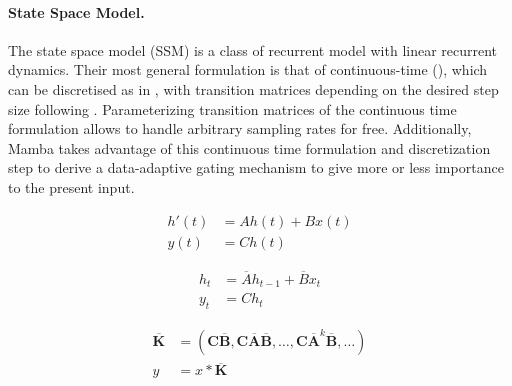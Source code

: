 
\paragraph{State Space Model.} The state space model (SSM) is a class of recurrent model with linear recurrent dynamics. Their most general formulation is that of continuous-time (), which can be discretised as in , with transition matrices depending on the desired step size following . Parameterizing transition matrices of the continuous time formulation allows to handle arbitrary sampling rates for free. Additionally, Mamba \citep{TODO:Mamba} takes advantage of this continuous time formulation and discretization step to derive a data-adaptive gating mechanism to give more or less importance to the present input.

\begin{minipage}[t]{.30\linewidth}
  \begin{subequations}
    \label{eq:ssm}
    \begin{align}
      h'(t) &= A h(t) + B x(t) \\
      y(t) &= C h(t)
    \end{align}
  \end{subequations}
\end{minipage}%
\begin{minipage}[t]{.30\linewidth}
  \begin{subequations}
    \label{eq:ssm:recurrence}
    \begin{align}
    \label{eq:ssm:recurrence:1}
      h_{t} &= \overline{A} h_{t-1} + \overline{B} x_t \\
    \label{eq:ssm:recurrence:2}
      y_t &= C h_t
    \end{align}
  \end{subequations}
\end{minipage}%
\begin{minipage}[t]{.39\linewidth}
  \begin{subequations}%
    \label{eq:ssm:convolution}
    \begin{align}
      \label{eq:ssm:convolution:1}
      \bm{\overline{K}} &= (\bm{C}\bm{\overline{B}}, \bm{C}\bm{\overline{A}}\bm{\overline{B}}, \dots, \bm{C}\bm{\overline{A}}^{k}\bm{\overline{B}}, \dots) \\
      \label{eq:ssm:convolution:2}
      y &= x \ast \bm{\overline{K}}
    \end{align}
  \end{subequations}
\end{minipage}

